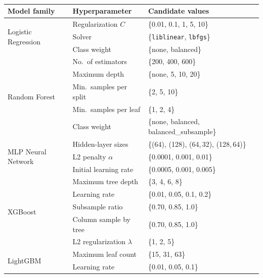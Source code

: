 \documentclass[diagnostics,article,submit,pdftex,moreauthors]{Definitions/mdpi}
\begin{document}
\begin{table}[htbp]
\caption{}
\label{tab:hpo-search-spaces}
\small
\begin{tabularx}{\linewidth}{llX}
\toprule
\textbf{Model family} & \textbf{Hyperparameter} & \textbf{Candidate values} \\
\midrule
\multirow{3}{*}{Logistic Regression}
  & Regularization $C$          & \{0.01, 0.1, 1, 5, 10\} \\
  & Solver                      & \{\texttt{liblinear}, \texttt{lbfgs}\} \\
  & Class weight                & \{none, balanced\} \\
\midrule
\multirow{5}{*}{Random Forest}
  & No.\ of estimators          & \{200, 400, 600\} \\
  & Maximum depth               & \{none, 5, 10, 20\} \\
  & Min.\ samples per split     & \{2, 5, 10\} \\
  & Min.\ samples per leaf      & \{1, 2, 4\} \\
  & Class weight                & \{none, balanced, balanced\_subsample\} \\
\midrule
\multirow{3}{*}{MLP Neural Network}
  & Hidden-layer sizes          & \{(64), (128), (64,\,32), (128,\,64)\} \\
  & L2 penalty $\alpha$         & \{0.0001, 0.001, 0.01\} \\
  & Initial learning rate       & \{0.0005, 0.001, 0.005\} \\
\midrule
\multirow{5}{*}{XGBoost}
  & Maximum tree depth          & \{3, 4, 6, 8\} \\
  & Learning rate               & \{0.01, 0.05, 0.1, 0.2\} \\
  & Subsample ratio             & \{0.70, 0.85, 1.0\} \\
  & Column sample by tree       & \{0.70, 0.85, 1.0\} \\
  & L2 regularization $\lambda$ & \{1, 2, 5\} \\
\midrule
\multirow{5}{*}{LightGBM}
  & Maximum leaf count          & \{15, 31, 63\} \\
  & Learning rate               & \{0.01, 0.05, 0.1\} \\

\end{tabularx}
\end{table}
\end{document}
